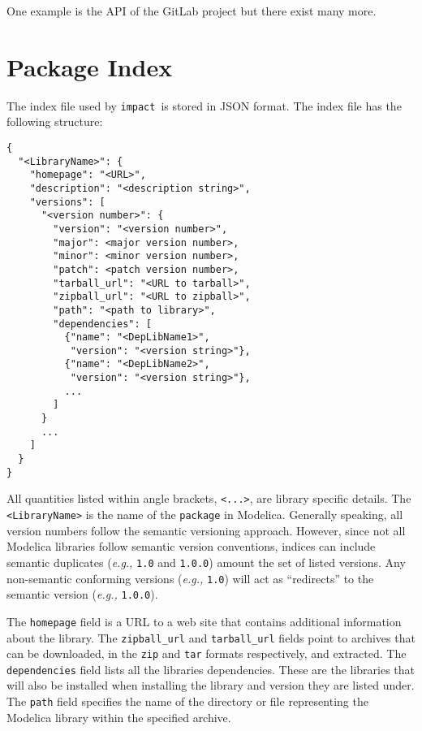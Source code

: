 \documentclass[11pt,a4paper,twocolumn]{article}
\newcommand{\impact}{\texttt{impact}} %
\newcommand{\code}[1]{\texttt{#1}} %
\begin{document}
One example is the API of the GitLab project\cite{gl-api} but there exist
many more.









\section{Package Index}
\label{sec:index}



The index file used by \impact\ is stored in JSON format.  The index file
has the following structure:

{\footnotesize
\begin{verbatim}
{
  "<LibraryName>": {
    "homepage": "<URL>",
    "description": "<description string>",
    "versions": [
      "<version number>": {
        "version": "<version number>",
        "major": <major version number>,
        "minor": <minor version number>,
        "patch": <patch version number>,
        "tarball_url": "<URL to tarball>",
        "zipball_url": "<URL to zipball>",
        "path": "<path to library>",
        "dependencies": [
          {"name": "<DepLibName1>",
           "version": "<version string>"},
          {"name": "<DepLibName2>",
           "version": "<version string>"},
          ...
        ]
      }
      ...
    ]
  }
}
\end{verbatim}
}

All quantities listed within angle brackets, \code{<...>}, are library
specific details.  The \code{<LibraryName>} is the name of the
\code{package} in Modelica.  Generally speaking, all version numbers
follow the semantic versioning approach.  However, since not all
Modelica libraries follow semantic version conventions, indices can
include semantic duplicates (\textit{e.g.,} \code{1.0} and
\code{1.0.0}) amount the set of listed versions.  Any non-semantic
conforming versions (\textit{e.g.,} \code{1.0}) will act as
``redirects'' to the semantic version (\textit{e.g.,} \code{1.0.0}).

The \code{homepage} field is a URL to a web site that contains
additional information about the library.  The \code{zipball\_url} and
\code{tarball\_url} fields point to archives that can be downloaded,
in the \code{zip} and \code{tar} formats respectively, and extracted.
The \code{dependencies} field lists all the libraries dependencies.
These are the libraries that will also be installed when installing
the library and version they are listed under.  The \code{path} field
specifies the name of the directory or file representing the Modelica
library within the specified archive.
\end{document}

